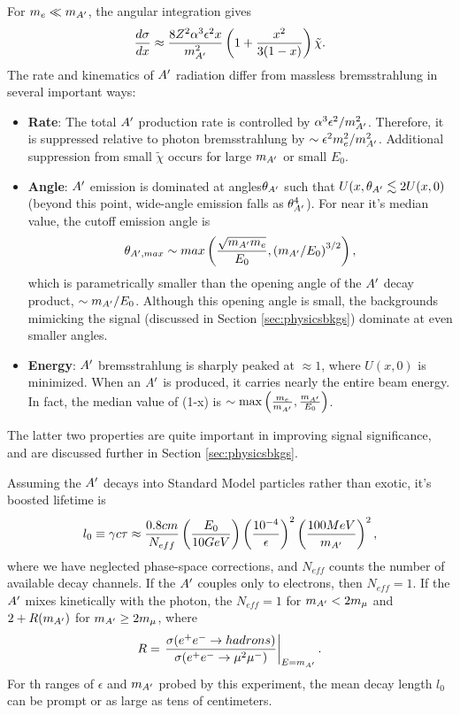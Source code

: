 For $m_e\ll m_{A^\prime}$, the angular integration gives
\begin{equation}
\frac{d\sigma}{dx}\approx \frac{8Z^2\alpha^3\epsilon^2 x}{m_{A^\prime}^2}\left(1+\frac{x^2}{3(1-x)}\right)\tilde{\chi} .
\end{equation}
The rate and kinematics of $A^\prime$ radiation differ from massless bremsstrahlung in several important ways:
\begin{itemize}
\item  {\bf Rate}: The total $A^\prime$ production rate is controlled by $\alpha^3\epsilon^2 / m_{A^\prime}^2$.  
 Therefore, it is suppressed relative to photon bremsstrahlung by $\sim \epsilon^2 m_e^2/m_{A^\prime}^2$.  Additional suppression from small $\tilde{\chi}$  occurs for large $m_{A^\prime}$  or small $E_0$.
\item {\bf Angle}:  $A^\prime$ emission is dominated at angles$\theta_{A^\prime}$ such that $U(x,\theta_{A^\prime}\lesssim 2 U(x,0)$ (beyond this point, wide-angle emission falls as $\theta_{A^\prime}^4$).  For near it's median value, the cutoff emission angle is
\begin{equation}
\theta_{A^\prime,max}\sim max\left(\frac{\sqrt{m_{A^\prime} m_e}}{E_0},\left(m_{A^\prime}/E_0\right)^{3/2}\right),
\end{equation}
which is parametrically smaller than the opening angle of the $A^\prime$ decay product, $\sim  m_{A^\prime}/E_0$.  Although this opening angle is small, the backgrounds mimicking the signal (discussed in Section \ref{sec:physicsbkgs}) dominate at even smaller angles.
\item {\bf Energy}:  $A^\prime$ bremsstrahlung is sharply peaked at $\approx 1$, where $U(x,0)$ is minimized.  When an $A^\prime$ is produced, it carries nearly the entire beam energy.  In fact, the median value of (1-x) is $\sim {\rm max}\left(\frac{m_e}{m_{A^\prime}},\frac{m_{A^\prime}}{E_0}\right)$.  
\end{itemize}
The  latter two properties are quite important in improving signal significance, and are discussed
further in Section \ref{sec:physicsbkgs}.

Assuming the $A^\prime$ decays into Standard Model particles rather than exotic, it's boosted lifetime is
\begin{equation}
l_0 \equiv \gamma c\tau \approx \frac{0.8 cm}{N_{eff}} \left(\frac{E_0}{10 GeV}\right)\left(\frac{10^{-4}}{\epsilon}\right)^2\left(\frac{100 MeV}{m_{A^\prime}}\right)^2,
\end{equation}
where we have neglected phase-space corrections, and $N_{eff}$ counts the number of available decay channels.  If the $A^\prime$ couples only to electrons, then $N_{eff}=1$.  If the $A^\prime$ mixes kinetically with the photon, the $N_{eff}=1$ for $m_{A^\prime} < 2m_\mu$ and $2+R(m_{A^\prime})$ for $m_{A^\prime} \geq 2 m_\mu$, where \cite{eehadrons}
\begin{equation}
R  =\left. \frac{\sigma(e^+e^-\rightarrow hadrons)}{\sigma (e^+e^- \rightarrow \mu^2\mu^-)}\right|_{E=m_{A^\prime}} . 
\end{equation} 
For th ranges of $\epsilon$ and $m_{A^\prime}$ probed by this experiment, the mean decay length $l_0$ can be prompt or as large as tens of centimeters.  

